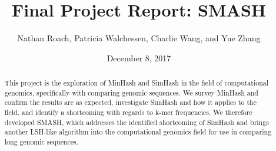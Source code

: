 \documentclass[12pt, letterpaper]{article}
\title{Final Project Report: SMASH}
\author{Nathan Roach, Patricia Walchessen, Charlie Wang, and Yue Zhang}
\date{December 8, 2017}
\begin{document}
\maketitle
\begin{abstract}
This project is the exploration of MinHash and SimHash in the
field of computational genomics, specifically with comparing genomic
sequences. We survey MinHash and confirm the results are as
expected, investigate SimHash and how it applies to the field, and
identify a shortcoming with regards to k-mer frequencies. We therefore 
developed SMASH, which addresses the identified shortcoming of
SimHash and brings another LSH-like algorithm into the computational
genomics field for use in comparing long genomic sequences.
\end{abstract}

\end{document}
